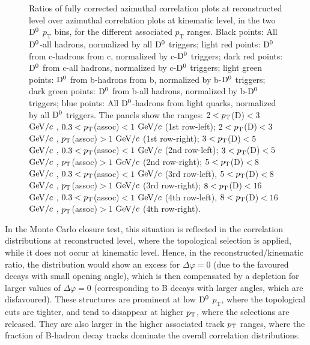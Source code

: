 \begin{figure}
\centering
\caption{Ratios of fully corrected azimuthal correlation plots at reconstructed level over azimuthal correlation plots at kinematic level, in the two ${\rm D^0}$ $p_\text{T}$ bins, for the different associated $p_\text{T}$ ranges. Black points: All ${\rm D^0}$-all hadrons, normalized by all ${\rm D^0}$ triggers; light red points: ${\rm D^0}$ from c-hadrons from c, normalized by c-${\rm D^0}$ triggers; dark red points: ${\rm D^0}$ from c-all hadrons, normalized by c-${\rm D^0}$ triggers; light green points: ${\rm D^0}$ from b-hadrons from b, normalized by b-${\rm D^0}$ triggers; dark green points: ${\rm D^0}$ from b-all hadrons, normalized by b-${\rm D^0}$ triggers; blue points: All ${\rm D^0}$-hadrons from light quarks, normalized by all ${\rm D^0}$ triggers.
The panels show the ranges: $2 < p_{\rm T}$(D)$ < 3$ $\mathrm{GeV}/c$ , $0.3 < p_{\rm T}$(assoc)$ < 1$ $\mathrm{GeV}/c$  (1st row-left); $2 < p_{\rm T}$(D)$ < 3$ $\mathrm{GeV}/c$ , $p_{\rm T}$(assoc)$ > 1$ $\mathrm{GeV}/c$  (1st row-right); $3 < p_{\rm T}$(D)$ < 5$ $\mathrm{GeV}/c$ , $0.3 < p_{\rm T}$(assoc)$ < 1$ $\mathrm{GeV}/c$  (2nd row-left); $3 < p_{\rm T}$(D)$ < 5$ $\mathrm{GeV}/c$ , $p_{\rm T}$(assoc)$ > 1$ $\mathrm{GeV}/c$  (2nd row-right);  $5 < p_{\rm T}$(D)$ < 8$ $\mathrm{GeV}/c$ , $0.3 < p_{\rm T}$(assoc)$ < 1$ $\mathrm{GeV}/c$  (3rd row-left), $5 < p_{\rm T}$(D)$ < 8$ $\mathrm{GeV}/c$ , $p_{\rm T}$(assoc)$ > 1$ $\mathrm{GeV}/c$  (3rd row-right); $8 < p_{\rm T}$(D)$ < 16$ $\mathrm{GeV}/c$ , $0.3 < p_{\rm T}$(assoc)$ < 1$ $\mathrm{GeV}/c$  (4th row-left), $8 < p_{\rm T}$(D)$ < 16$ $\mathrm{GeV}/c$ , $p_{\rm T}$(assoc)$ > 1$ $\mathrm{GeV}/c$  (4th row-right).}
\label{fig:MC_Ratios}
\end{figure}

In the Monte Carlo closure test, this situation is reflected in the correlation distributions at reconstructed level, where the topological selection is applied, while it does not occur at kinematic level. Hence, in the reconstructed/kinematic ratio, the distribution would show an excess for $\Delta\varphi = 0$ (due to the favoured decays with small opening angle), which is then compensated by a depletion for larger values of $\Delta\varphi = 0$ (corresponding to B decays with larger angles, which are disfavoured).
These structures are prominent at low ${\rm D^0}$ $p_\text{T}$, where the topological cuts are tighter, and tend to disappear at higher $p_{\rm T}$, where the selections are released. They are also larger in the higher associated track $p_{\rm T}$ ranges, where the fraction of B-hadron decay tracks dominate the overall correlation distributions.


